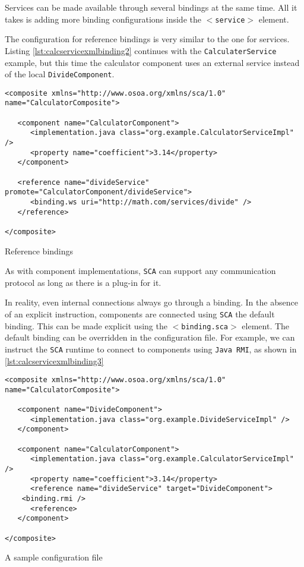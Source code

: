 Services can be made available through several bindings at the same time. All it takes is adding more binding configurations
inside the \texttt{$<$service$>$} element.

The configuration for reference bindings is very similar to the one for services. Listing \ref{lst:calcservicexmlbinding2}
continues with the \texttt{CalculaterService} example, but this time the calculator component uses an external service
instead of the local \texttt{DivideComponent}.

\begin{listing}
\begin{verbatim}
<composite xmlns="http://www.osoa.org/xmlns/sca/1.0" name="CalculatorComposite">

   <component name="CalculatorComponent">
      <implementation.java class="org.example.CalculatorServiceImpl" />
      <property name="coefficient">3.14</property>
   </component>
   
   <reference name="divideService" promote="CalculatorComponent/divideService">
      <binding.ws uri="http://math.com/services/divide" />
   </reference>
   
</composite>
\end{verbatim}
\caption{Reference bindings}
\label{lst:calcservicexmlbinding2}
\end{listing}

As with component implementations, \texttt{SCA} can support any communication protocol as long as there is a plug-in for it.

In reality, even internal connections always go through a binding. In the absence of an explicit instruction, components
are connected using \texttt{SCA} the default binding. This can be made explicit using the \texttt{$<$binding.sca$>$} element.
The default binding can be overridden in the configuration file. For example, we can instruct the \texttt{SCA} runtime to
connect to components using \texttt{Java RMI}, as shown in \ref{lst:calcservicexmlbinding3}

\begin{listing}
\begin{verbatim}
<composite xmlns="http://www.osoa.org/xmlns/sca/1.0" name="CalculatorComposite">

   <component name="DivideComponent">
      <implementation.java class="org.example.DivideServiceImpl" />
   </component>

   <component name="CalculatorComponent">
      <implementation.java class="org.example.CalculatorServiceImpl" />
      <property name="coefficient">3.14</property>
      <reference name="divideService" target="DivideComponent">
	<binding.rmi />
      <reference>
   </component>

</composite>
\end{verbatim}
\caption{A sample configuration file}
\label{lst:calcservicexmlbinding3}
\end{listing}

